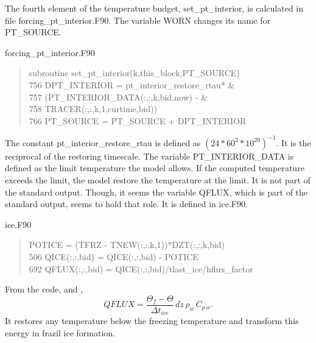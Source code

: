 The fourth element of the temperature budget, set\_pt\_interior, is calculated in file forcing\_pt\_interior.F90. The variable WORN changes its name for PT\_SOURCE. 
\begin{center} forcing\_pt\_interior.F90 \end{center}
\begin{quotation}
\small
\linespread{0.5}\selectfont{} \hspace{1em} subroutine set\_pt\_interior(k,this\_block,PT\_SOURCE)\\
756 \hspace{1em}           DPT\_INTERIOR = pt\_interior\_restore\_rtau*         \&\\
757 \hspace{1em}                         (PT\_INTERIOR\_DATA(:,:,k,bid,now) - \&\\
758 \hspace{1em}                          TRACER(:,:,k,1,curtime,bid))\\
766 \hspace{1em}     PT\_SOURCE = PT\_SOURCE + DPT\_INTERIOR\\
\end{quotation}
The constant pt\_interior\_restore\_rtau is defined as $(24*60^2*10^{20})^{-1}$. It is the reciprocal of the restoring timescale. The variable PT\_INTERIOR\_DATA is defined as the limit temperature the model allows. If the computed temperature exceeds the limit, the model restore the temperature at the limit. It is not part of the standard output. Though, it seems the variable QFLUX, which is part of the standard output, seems to hold that role. It is defined in ice.F90.
\begin{center} ice.F90 \end{center}
\begin{quotation}
\small
\linespread{0.5}\selectfont{} \hspace{1em}            POTICE = (TFRZ - TNEW(:,:,k,1))*DZT(:,:,k,bid)\\
506 \hspace{1em}      QICE(:,:,bid) = QICE(:,:,bid) - POTICE\\
692  \hspace{1em}   QFLUX(:,:,bid) = QICE(:,:,bid)/tlast\_ice/hflux\_factor\\
\end{quotation}
\noindent From the code, \cite{Hunke:2008ly} and \cite{SG4},
\begin{equation}
 QFLUX = \frac{\Theta_f - \Theta}{\Delta t_{ice}} \, dz \, \rho_w \, C_{p\,w}.
\end{equation}
It restores any temperature below the freezing temperature and transform this energy in frazil ice formation. 

